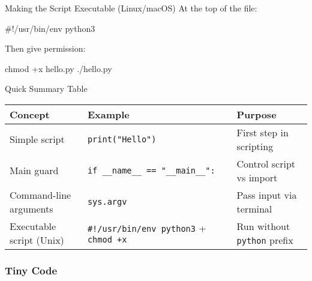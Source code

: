 \documentclass[
  letterpaper,
  DIV=11,
  numbers=noendperiod]{scrreprt}
\newenvironment{Shaded}{\begin{snugshade}}{\end{snugshade}}
\newcommand{\CommentTok}[1]{\textcolor[rgb]{0.37,0.37,0.37}{#1}}
\newcommand{\ExtensionTok}[1]{\textcolor[rgb]{0.00,0.23,0.31}{#1}}
\newcommand{\FunctionTok}[1]{\textcolor[rgb]{0.28,0.35,0.67}{#1}}
\newcommand{\NormalTok}[1]{\textcolor[rgb]{0.00,0.23,0.31}{#1}}
\begin{document}
Making the Script Executable (Linux/macOS) At the top of the file:

\begin{Shaded}
\begin{Highlighting}[]
\CommentTok{\#!/usr/bin/env python3}
\end{Highlighting}
\end{Shaded}

Then give permission:

\begin{Shaded}
\begin{Highlighting}[]
\FunctionTok{chmod}\NormalTok{ +x hello.py}
\ExtensionTok{./hello.py}
\end{Highlighting}
\end{Shaded}

Quick Summary Table

\begin{longtable}[]{@{}
  >{\raggedright\arraybackslash}p{}
  >{\raggedright\arraybackslash}p{}
  >{\raggedright\arraybackslash}p{}@{}}
\toprule\noalign{}
\begin{minipage}[b]{\linewidth}\raggedright
Concept
\end{minipage} & \begin{minipage}[b]{\linewidth}\raggedright
Example
\end{minipage} & \begin{minipage}[b]{\linewidth}\raggedright
Purpose
\end{minipage} \\
\midrule\noalign{}
\endhead
\bottomrule\noalign{}
\endlastfoot
Simple script & \texttt{print("Hello")} & First step in scripting \\
Main guard & \texttt{if\ \_\_name\_\_\ ==\ "\_\_main\_\_":} & Control
script vs import \\
Command-line arguments & \texttt{sys.argv} & Pass input via terminal \\
Executable script (Unix) & \texttt{\#!/usr/bin/env\ python3} +
\texttt{chmod\ +x} & Run without \texttt{python} prefix \\
\end{longtable}

\subsubsection{Tiny Code}\label{tiny-code-95}
\end{document}
